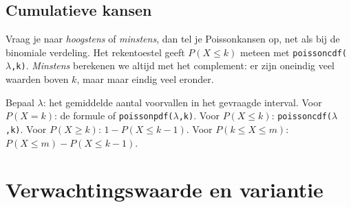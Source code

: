\begin{oefeningen}
\end{oefeningen}

\subsection{Cumulatieve kansen}

Vraag je naar \textit{hoogstens} of \textit{minstens}, dan tel je Poissonkansen op, net als bij de binomiale verdeling. Het rekentoestel geeft $P(X \leqslant k)$ meteen met \texttt{poissoncdf($\lambda$,k)}. \textit{Minstens} berekenen we altijd met het complement: er zijn oneindig veel waarden boven $k$, maar maar eindig veel eronder.


\begin{werkwijze}
Bepaal $\lambda$: het gemiddelde aantal voorvallen in het gevraagde interval. Voor $P(X = k)$: de formule of \texttt{poissonpdf($\lambda$,k)}. Voor $P(X \leqslant k)$: \texttt{poissoncdf($\lambda$,k)}. Voor $P(X \geqslant k)$: $1 - P(X \leqslant k - 1)$. Voor $P(k \leqslant X \leqslant m)$: $P(X \leqslant m) - P(X \leqslant k - 1)$.
\end{werkwijze}

\begin{oefeningen}
\end{oefeningen}

\section{Verwachtingswaarde en variantie}

